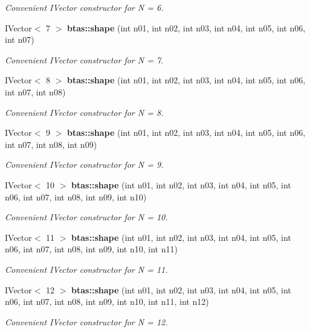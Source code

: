\begin{DoxyCompactItemize}
\begin{DoxyCompactList}\small\item\em Convenient I\-Vector constructor for N = 6. \end{DoxyCompactList}\item 
I\-Vector$<$ 7 $>$ {\bf btas\-::shape} (int n01, int n02, int n03, int n04, int n05, int n06, int n07)
\begin{DoxyCompactList}\small\item\em Convenient I\-Vector constructor for N = 7. \end{DoxyCompactList}\item 
I\-Vector$<$ 8 $>$ {\bf btas\-::shape} (int n01, int n02, int n03, int n04, int n05, int n06, int n07, int n08)
\begin{DoxyCompactList}\small\item\em Convenient I\-Vector constructor for N = 8. \end{DoxyCompactList}\item 
I\-Vector$<$ 9 $>$ {\bf btas\-::shape} (int n01, int n02, int n03, int n04, int n05, int n06, int n07, int n08, int n09)
\begin{DoxyCompactList}\small\item\em Convenient I\-Vector constructor for N = 9. \end{DoxyCompactList}\item 
I\-Vector$<$ 10 $>$ {\bf btas\-::shape} (int n01, int n02, int n03, int n04, int n05, int n06, int n07, int n08, int n09, int n10)
\begin{DoxyCompactList}\small\item\em Convenient I\-Vector constructor for N = 10. \end{DoxyCompactList}\item 
I\-Vector$<$ 11 $>$ {\bf btas\-::shape} (int n01, int n02, int n03, int n04, int n05, int n06, int n07, int n08, int n09, int n10, int n11)
\begin{DoxyCompactList}\small\item\em Convenient I\-Vector constructor for N = 11. \end{DoxyCompactList}\item 
I\-Vector$<$ 12 $>$ {\bf btas\-::shape} (int n01, int n02, int n03, int n04, int n05, int n06, int n07, int n08, int n09, int n10, int n11, int n12)
\begin{DoxyCompactList}\small\item\em Convenient I\-Vector constructor for N = 12. \end{DoxyCompactList}\item 

\end{DoxyCompactItemize}
